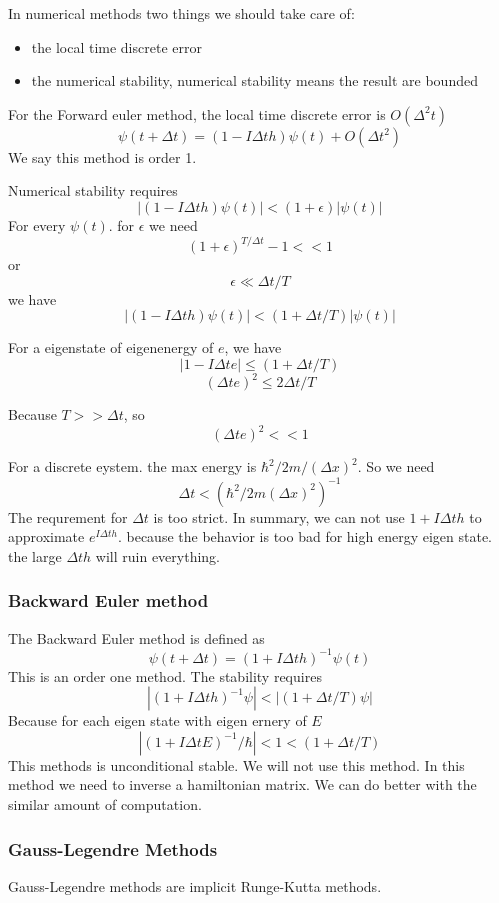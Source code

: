 \documentclass[12pt,twoside]{article}
\begin{document}
In numerical methods two things we should take care of:
\begin{itemize}
\item the local time discrete error
\item the numerical stability, numerical stability means the result are bounded
\end{itemize}
For the Forward euler method, the local time discrete error is $O(\Delta ^2 t)$
$$
\psi(t + \Delta t) = (1 - I \Delta t h)\psi(t) + O(\Delta t^2)
$$
We say this method is order 1.

Numerical stability requires
$$
|(1 - I \Delta t h)\psi(t)| < (1 + \epsilon)|\psi(t)|
$$
For every $\psi(t)$. for $\epsilon$ we need
$$
(1 + \epsilon)^{T/\Delta t} - 1 << 1
$$
or
$$
\epsilon \ll \Delta t / T
$$
we have
$$
|(1 - I \Delta t h)\psi(t)| < (1 + \Delta t / T)|\psi(t)|
$$

 For a eigenstate of eigenenergy of $e$, we have
$$
| 1 - I \Delta t e| \le (1 + \Delta t / T)
$$
$$
(\Delta t e)^2 \le 2 \Delta t / T
$$

Because $T >> \Delta t$, so
$$
(\Delta t e)^2 << 1
$$

For a discrete eystem. the max energy is $\hbar^2/2m/(\Delta x)^2$. So we need
$$
\Delta t < (\hbar^2/2m(\Delta x)^2)^{-1}
$$
The requrement for $\Delta t$ is too strict.
In summary, we can not use $1 + I\Delta t h$ to approximate $e^{I\Delta t h}$. because the behavior is too bad for high energy eigen state. the large $\Delta t h$ will ruin everything.

\subsubsection{Backward Euler method}
The Backward Euler method is defined as
$$
\psi(t + \Delta t) = (1 + I \Delta t h)^{-1} \psi(t)
$$
This is an order one method.
The stability requires
$$
|(1 + I \Delta t h)^{-1}\psi| < |(1 + \Delta t / T) \psi|
$$
Because for each eigen state with eigen ernery of $E$
$$
|(1 + I \Delta t E)^{-1}/\hbar| < 1 < (1 + \Delta t / T)
$$
This methods is unconditional stable. We will not use this method. In this method we need to inverse a hamiltonian matrix.
We can do better with the similar amount of computation.

\subsubsection{Gauss-Legendre Methods}

Gauss-Legendre methods are implicit Runge-Kutta methods.
\end{document}
